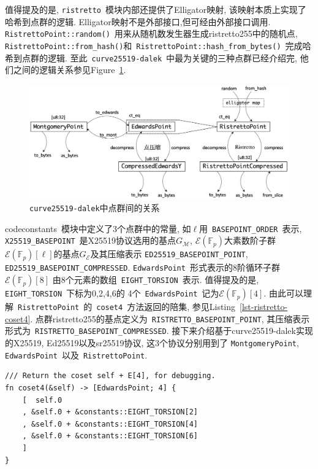 \documentclass{article}
\newcommand{\F}{\mathbb{F}}
\newcommand{\code}[1]{\lstinline!#1!}
\begin{document}
值得提及的是, \code{ristretto}~模块内部还提供了Elligator映射, 该映射本质上实现了哈希到点群的逻辑.
Elligator映射不是外部接口,但可经由外部接口调用.
\code{RistrettoPoint::random()}~用来从随机数发生器生成\textsf{ristretto255}中的随机点,
\code{RistrettoPoint::from_hash()}和~\code{RistrettoPoint::hash_from_bytes()}~完成哈希到点群的逻辑.
至此~\code{curve25519-dalek}~中最为关键的三种点群已经介绍完,
他们之间的逻辑关系参见Figure~\ref{fig-curve25519dalek}.

\begin{figure}[htbp]
\centering
\includegraphics[width=\textwidth]{curve25519-dalek.png}
\caption{\code{curve25519-dalek}中点群间的关系}\label{fig-curve25519dalek}
\end{figure}

code{constants}~模块中定义了3个点群中的常量, 如$\ell$用~\code{BASEPOINT_ORDER}~表示,
\code{X25519_BASEPOINT}~是X25519协议选用的基点$G_{\mathcal{M}}$,
$\mathcal{E}(\F_p)$大素数阶子群$\mathcal{E}(\F_p)[\ell]$的基点$G_{\mathcal{E}}$及其压缩表示
\code{ED25519_BASEPOINT_POINT}, \code{ED25519_BASEPOINT_COMPRESSED}.
\code{EdwardsPoint}~形式表示的8阶循环子群$\mathcal{E}(\F_p)[8]$
由8个元素的数组~\code{EIGHT_TORSION}~表示. 
值得提及的是, \code{EIGHT_TORSION}~下标为0,2,4,6的
4个~\code{EdwardsPoint}~记为$\mathcal{E}(\F_p)[4]$.
由此可以理解~\code{RistrettoPoint}~的~\code{coset4}~方法返回的陪集, 
参见Listing~\ref{lst-ristretto-coset4}.
点群\textsf{ristretto255}的基点定义为~\code{RISTRETTO_BASEPOINT_POINT},
其压缩表示形式为~\code{RISTRETTO_BASEPOINT_COMPRESSED}.
接下来介绍基于\textsf{curve25519-dalek}实现的\textsf{X25519},
\textsf{Ed25519}以及\textsf{sr25519}协议, 这3个协议分别用到了
\code{MontgomeryPoint}, \code{EdwardsPoint}~以及~\code{RistrettoPoint}.

\begin{lstlisting}[caption=\code{RistrettoPoint}~的~\code{coset4}~方法, label=lst-ristretto-coset4]
/// Return the coset self + E[4], for debugging.
fn coset4(&self) -> [EdwardsPoint; 4] {
    [  self.0
    , &self.0 + &constants::EIGHT_TORSION[2]
    , &self.0 + &constants::EIGHT_TORSION[4]
    , &self.0 + &constants::EIGHT_TORSION[6]
    ]
}
\end{lstlisting}
\end{document}
